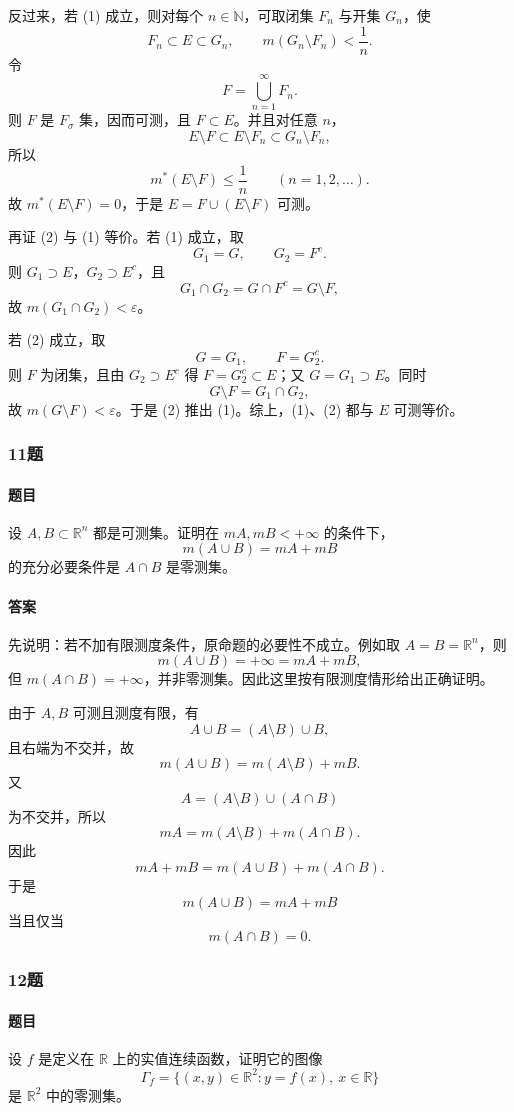 \documentclass{article}
\newcommand{\eps}{\varepsilon}
\begin{document}
	反过来，若 (1) 成立，则对每个 $n\in\mathbb{N}$，可取闭集 $F_n$ 与开集 $G_n$，使
	\[
	F_n\subset E\subset G_n,\qquad m(G_n\setminus F_n)<\frac1n.
	\]
	令
	\[
	F=\bigcup_{n=1}^{\infty}F_n.
	\]
	则 $F$ 是 $F_\sigma$ 集，因而可测，且 $F\subset E$。并且对任意 $n$，
	\[
	E\setminus F\subset E\setminus F_n\subset G_n\setminus F_n,
	\]
	所以
	\[
	m^*(E\setminus F)\le \frac1n\qquad(n=1,2,\ldots).
	\]
	故 $m^*(E\setminus F)=0$，于是 $E=F\cup(E\setminus F)$ 可测。
	
	再证 (2) 与 (1) 等价。若 (1) 成立，取
	\[
	G_1=G,
	\qquad
	G_2=F^c.
	\]
	则 $G_1\supset E$，$G_2\supset E^c$，且
	\[
	G_1\cap G_2=G\cap F^c=G\setminus F,
	\]
	故 $m(G_1\cap G_2)<\eps$。
	
	若 (2) 成立，取
	\[
	G=G_1,
	\qquad
	F=G_2^c.
	\]
	则 $F$ 为闭集，且由 $G_2\supset E^c$ 得 $F=G_2^c\subset E$；又 $G=G_1\supset E$。同时
	\[
	G\setminus F=G_1\cap G_2,
	\]
	故 $m(G\setminus F)<\eps$。于是 (2) 推出 (1)。综上，(1)、(2) 都与 $E$ 可测等价。
	
	\subsubsection*{11题}
	\paragraph{题目} 设 $A,B\subset\mathbb{R}^n$ 都是可测集。证明在 $mA,mB<+\infty$ 的条件下，
	\[
	m(A\cup B)=mA+mB
	\]
	的充分必要条件是 $A\cap B$ 是零测集。
	
	\paragraph{答案} 先说明：若不加有限测度条件，原命题的必要性不成立。例如取 $A=B=\mathbb{R}^n$，则
	\[
	m(A\cup B)=+\infty=mA+mB,
	\]
	但 $m(A\cap B)=+\infty$，并非零测集。因此这里按有限测度情形给出正确证明。
	
	由于 $A,B$ 可测且测度有限，有
	\[
	A\cup B=(A\setminus B)\cup B,
	\]
	且右端为不交并，故
	\[
	m(A\cup B)=m(A\setminus B)+mB.
	\]
	又
	\[
	A=(A\setminus B)\cup(A\cap B)
	\]
	为不交并，所以
	\[
	mA=m(A\setminus B)+m(A\cap B).
	\]
	因此
	\[
	mA+mB=m(A\cup B)+m(A\cap B).
	\]
	于是
	\[
	m(A\cup B)=mA+mB
	\]
	当且仅当
	\[
	m(A\cap B)=0.
	\]
	
	\subsubsection*{12题}
	\paragraph{题目} 设 $f$ 是定义在 $\mathbb{R}$ 上的实值连续函数，证明它的图像
	\[
	\Gamma_f=\{(x,y)\in\mathbb{R}^2:y=f(x),\ x\in\mathbb{R}\}
	\]
	是 $\mathbb{R}^2$ 中的零测集。
	
\end{document}
